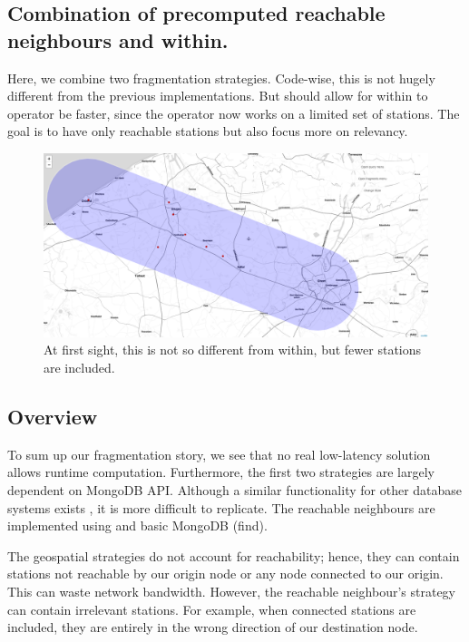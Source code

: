 \subsection{Combination of precomputed reachable neighbours and within.}
Here, we combine two fragmentation strategies. Code-wise, this is not hugely different from the previous implementations. But should allow for within to operator be faster, since the operator now works on a limited set of stations. The goal is to have only reachable stations but also focus more on relevancy. 
\begin{figure}[H]
    \centering
    \includegraphics[width=\textwidth]{images/precomputed within.png}
    \caption{At first sight, this is not so different from within, but fewer stations are included.}
    \label{fig:precomputedwithin}
\end{figure}
\subsection{Overview}

To sum up our fragmentation story, we see that no real low-latency solution allows runtime computation. Furthermore, the first two strategies are largely dependent on MongoDB API. Although a similar functionality for other database systems exists \cite{noauthor_postgis_nodate}, it is more difficult to replicate. The reachable neighbours are implemented using  and basic MongoDB  (find). 

The geospatial strategies do not account for reachability; hence, they can contain stations not reachable by our origin node or any node connected to our origin. This can waste network bandwidth. However, the reachable neighbour's strategy can contain irrelevant stations. For example, when connected stations are included, they are entirely in the wrong direction of our destination node. 

